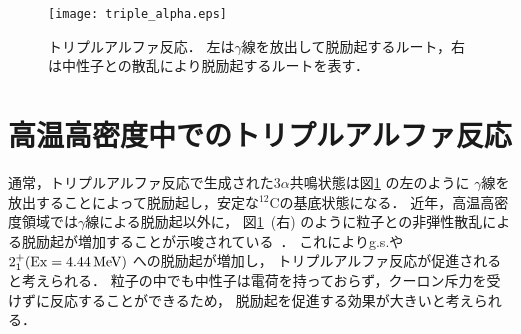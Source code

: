 \documentclass[../master]{subfiles}
\begin{document}
\begin{figure}
  \centering
  \texttt{[image: triple\_alpha.eps]}
  \caption[トリプルアルファ反応．]{トリプルアルファ反応．
    左は$\gamma$線を放出して脱励起するルート，右は中性子との散乱により脱励起するルートを表す．}
  \label{fig::triple_alpha}
\end{figure}%

\section{高温高密度中でのトリプルアルファ反応}
\label{seq::triplealphareaction}
通常，トリプルアルファ反応で生成された$3\alpha$共鳴状態は図\ref{fig::triple_alpha} の左のように
$\gamma$線を放出することによって脱励起し，安定な${}^{12}\mathrm{C}$の基底状態になる．
近年，高温高密度領域では$\gamma$線による脱励起以外に，
図\ref{fig::triple_alpha}~(右) のように粒子との非弾性散乱による脱励起が増加することが示唆されている~\cite{hotdensemedium}．
これによりg.s.や$2_{1}^{+} ({\rm Ex} = \SI{4.44}{\mega\electronvolt})$ への脱励起が増加し，
トリプルアルファ反応が促進されると考えられる．
粒子の中でも中性子は電荷を持っておらず，クーロン斥力を受けずに反応することができるため，
脱励起を促進する効果が大きいと考えられる．


\end{document}
